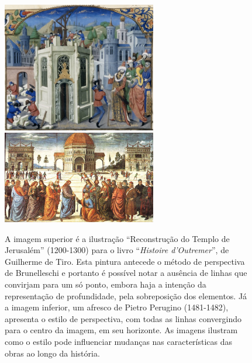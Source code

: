 \begin{figure}[h!]
  \begin{center}
\caption{A imagem superior é a ilustração ``Reconstrução do
        Templo de Jerusalém'' (1200-1300) para o livro
        ``\textit{Histoire d'Outremer}'', de Guilherme de Tiro. Esta
        pintura antecede o método de perspectiva de Brunelleschi e
        portanto é possível notar a ausência de linhas que convirjam
        para um só ponto, embora haja a intenção da representação de
        profundidade, pela sobreposição dos elementos. Já a imagem
        inferior, um afresco de Pietro Perugino (1481-1482), apresenta
        o estilo de perspectiva, com todas as linhas convergindo para
        o centro da imagem, em seu horizonte. As imagens ilustram como
        o estilo pode influenciar mudanças nas características das
        obras ao longo da história.}
    \label{fig:perspectiva}
    \includegraphics[width=0.6\textwidth]{figs/perspectiva1.png} \\
    \vspace{1cm}
    \includegraphics[width=0.6\textwidth]{figs/perspectiva2.png}
      
\end{center}
\end{figure}


